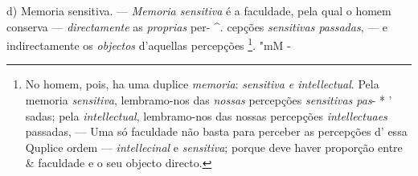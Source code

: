 d) Memoria sensitiva. --- \emph{Memoria sensitiva} é a faculdade, pela qual o homem conserva --- \emph{directamente} as \emph{proprias} per- \textasciicircum{}. cepções \emph{sensitivas passadas}, --- e indirectamente os \emph{objectos} d'aquellas percepções \footnote{No homem, pois, ha uma duplice \emph{memoria}: \emph{sensitiva e intellectual}. Pela memoria \emph{sensitiva}, lembramo-nos das \emph{nossas} percepções \emph{sensitivas pas}- * ' sadas; pela \emph{intellectual}, lembramo-nos das nossas percepções \emph{intellectuaes} passadas, --- Uma só faculdade não basta para perceber as percepções d' essa Quplice ordem --- \emph{intellecinal} e \emph{sensitiva}; porque deve haver proporção entre \textbar{} \& faculdade e o seu objecto directo.}. "mM -


 
